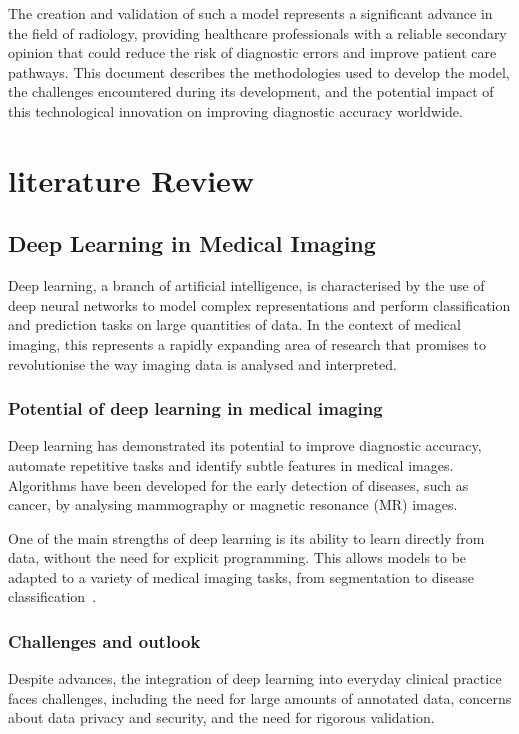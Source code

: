 \documentclass[12pt,oneside]{book} %
\begin{document}
The creation and validation of such a model represents a significant advance in
the field of radiology, providing healthcare professionals with a reliable
secondary opinion that could reduce the risk of diagnostic errors and improve
patient care pathways. This document describes the methodologies used to
develop the model, the challenges encountered during its development, and the
potential impact of this technological innovation on improving diagnostic
accuracy worldwide.

\chapter{literature Review}

\section{Deep Learning in Medical Imaging}

Deep learning, a branch of artificial intelligence, is characterised by the use
of deep neural networks to model complex representations and perform
classification and prediction tasks on large quantities of data. In the context
of medical imaging, this represents a rapidly expanding area of research that
promises to revolutionise the way imaging data is analysed and interpreted.

\subsection{Potential of deep learning in medical imaging}

Deep learning has demonstrated its potential to improve diagnostic accuracy,
automate repetitive tasks and identify subtle features in medical images.
Algorithms have been developed for the early detection of diseases, such as
cancer, by analysing mammography or magnetic resonance (MR) images.

One of the main strengths of deep learning is its ability to learn directly
from data, without the need for explicit programming. This allows models to be
adapted to a variety of medical imaging tasks, from segmentation to disease
classification~\cite{LITJENS201760}.

\subsection{Challenges and outlook}

Despite advances, the integration of deep learning into everyday clinical
practice faces challenges, including the need for large amounts of annotated
data, concerns about data privacy and security, and the need for rigorous
validation.
\end{document}
